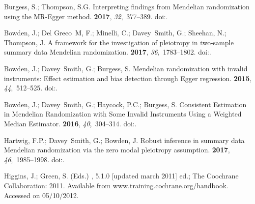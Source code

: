 \documentclass[genes,article,accept,moreauthors,pdftex]{Definitions/mdpi}
\begin{document}
\begin{thebibliography}{999}
Burgess, S.; Thompson, S.G.
\newblock Interpreting findings from {Mendelian} randomization using the
  {MR}-{Egger} method.
 {\bf 2017}, {\em
  32},~377--389.
\newblock
  doi:{\href{https://doi.org/10.1007/s10654-017-0255-x}{}}.

Bowden, J.; Del Greco~M, F.; Minelli, C.; Davey~Smith, G.; Sheehan, N.;
  Thompson, J.
\newblock A framework for the investigation of pleiotropy in two-sample summary
  data {Mendelian} randomization.
 {\bf 2017}, {\em 36},~1783--1802.
\newblock
  doi:{\href{https://doi.org/10.1002/sim.7221}{}}.

Bowden, J.; Davey~Smith, G.; Burgess, S.
\newblock Mendelian randomization with invalid instruments: Effect estimation
  and bias detection through {Egger} regression.
 {\bf 2015}, {\em
  44},~512--525.
\newblock
  doi:{\href{https://doi.org/10.1093/ije/dyv080}{}}.

Bowden, J.; Davey~Smith, G.; Haycock, P.C.; Burgess, S.
\newblock Consistent {Estimation} in {Mendelian} {Randomization} with {Some}
  {Invalid} {Instruments} {Using} a {Weighted} {Median} {Estimator}.
 {\bf 2016}, {\em 40},~304--314.
\newblock
  doi:{\href{https://doi.org/10.1002/gepi.21965}{}}.

Hartwig, F.P.; Davey~Smith, G.; Bowden, J.
\newblock Robust inference in summary data {Mendelian} randomization via the
  zero modal pleiotropy assumption.
 {\bf 2017}, {\em
  46},~1985--1998.
\newblock
  doi:{\href{https://doi.org/10.1093/ije/dyx102}{}}.

Higgins, J.; Green, S. (Eds.)
, {5.1.0 [updated march 2011] ed.}; {The Coochrane
  Collaboration:}  2011. Available from www.training.cochrane.org/handbook. Accessed on 05/10/2012. 


\end{thebibliography}
\end{document}
